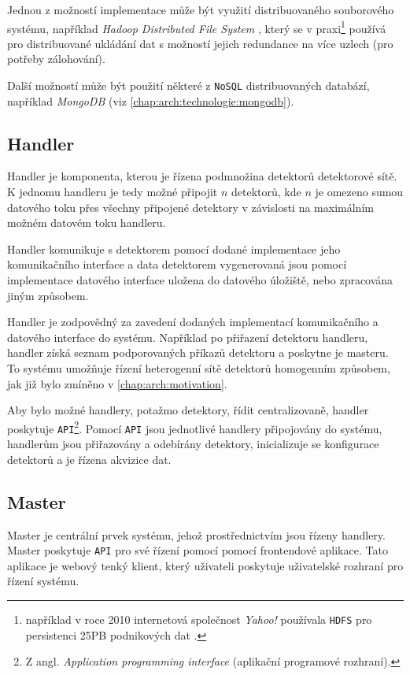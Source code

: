 Jednou z možností implementace může být využití distribuovaného souborového systému, například \textit{Hadoop Distributed File System} \cite{HDFS}, který se v praxi\footnote{například v roce 2010 internetová společnost \textit{Yahoo!} používala \texttt{HDFS} pro persistenci \unit{25}{PB} podnikových dat \cite{HDFS}.} používá pro distribuované ukládání dat s možností jejich redundance na více uzlech (pro potřeby zálohování). 

Další možností může být použití některé z \texttt{NoSQL} distribuovaných databází, například \textit{MongoDB} (viz \ref{chap:arch:technologie:mongodb}).

\subsection{Handler}
Handler je komponenta, kterou je řízena podmnožina detektorů detektorové sítě. K jednomu handleru je tedy možné připojit $n$ detektorů, kde $n$ je omezeno sumou datového toku přes všechny připojené detektory v závislosti na maximálním možném datovém toku handleru.

Handler komunikuje s detektorem pomocí dodané implementace jeho komunikačního interface a data detektorem vygenerovaná jsou pomocí implementace datového interface uložena do datového úložiště, nebo zpracována jiným způsobem.

Handler je zodpovědný za zavedení dodaných implementací komunikačního a datového interface do systému. Například po přiřazení detektoru handleru, handler získá seznam podporovaných příkazů detektoru a poskytne je masteru. To systému umožňuje řízení heterogenní sítě detektorů homogenním způsobem, jak již bylo zmíněno v \ref{chap:arch:motivation}.

Aby bylo možné handlery, potažmo detektory, řídit centralizovaně, handler poskytuje \texttt{API}\footnote{Z angl. \textit{Application programming interface} (aplikační programové rozhraní).}. Pomocí \texttt{API} jsou jednotlivé handlery připojovány do systému, handlerům jsou přiřazovány a odebírány detektory, inicializuje se konfigurace detektorů a je řízena akvizice dat.

\subsection{Master}
Master je centrální prvek systému, jehož prostřednictvím jsou řízeny handlery. Master poskytuje \texttt{API} pro své řízení pomocí pomocí frontendové aplikace. Tato aplikace je webový tenký klient, který uživateli poskytuje uživatelské rozhraní pro řízení systému.

